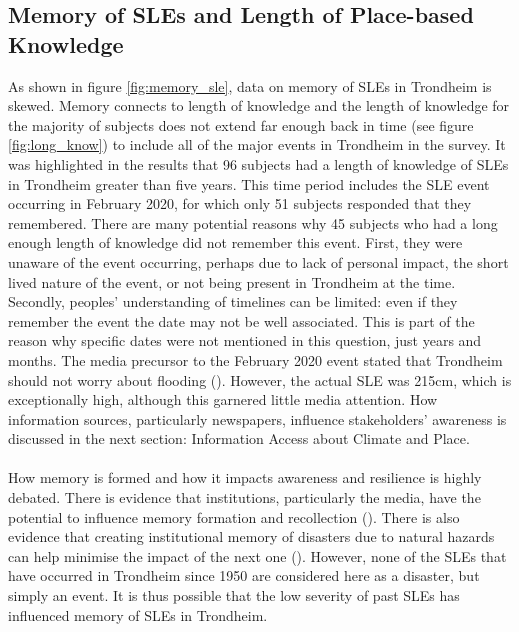\subsection{Memory of SLEs and Length of Place-based Knowledge}\label{discuss-memory}
As shown in figure \ref{fig:memory_sle}, data on memory of SLEs in Trondheim is skewed. Memory connects to length of knowledge and the length of knowledge for the majority of subjects does not extend far enough back in time (see figure \ref{fig:long_know}) to include all of the major events in Trondheim in the survey. It was highlighted in the results that 96 subjects had a length of knowledge of SLEs in Trondheim greater than five years. This time period includes the SLE event occurring in February 2020, for which only 51 subjects responded that they remembered. There are many potential reasons why 45 subjects who had a long enough length of knowledge did not remember this event. First, they were unaware of the event occurring, perhaps due to lack of personal impact, the short lived nature of the event, or not being present in Trondheim at the time. Secondly, peoples' understanding of timelines can be limited: even if they remember the event the date may not be well associated. This is part of the reason why specific dates were not mentioned in this question, just years and months. The media precursor to the February 2020 event stated that Trondheim should not worry about flooding (\cite{baisotti_danger_2020}). However, the actual SLE was 215cm, which is exceptionally high, although this garnered little media attention. How information sources, particularly newspapers, influence stakeholders' awareness is discussed in the next section: Information Access about Climate and Place.
\paragraph{}
How memory is formed and how it impacts awareness and resilience is highly debated. There is evidence that institutions, particularly the media, have the potential to influence memory formation and recollection (\cite{de_guttry_expiry_2022}). There is also evidence that creating institutional memory of disasters due to natural hazards can help minimise the impact of the next one (\cite{de_guttry_expiry_2022}). However, none of the SLEs that have occurred in Trondheim since 1950 are considered here as a disaster, but simply an event. It is thus possible that the low severity of past SLEs has influenced memory of SLEs in Trondheim. 
\paragraph{}

